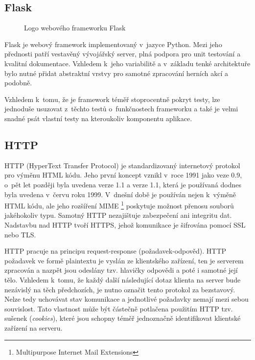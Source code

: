 \subsection{Flask}
\label{subsec:flask}
\begin{wrapfigure}[16]{R}{\textwidth/3}
    \centering
    
    \caption{Logo webového frameworku Flask}
\end{wrapfigure}

Flask je webový framework implementovaný v~jazyce Python. Mezi jeho přednosti patří vestavěný vývojářský server, plná podpora pro unit testování a kvalitní dokumentace. Vzhledem k~jeho variabilitě a v~základu tenké architektuře bylo nutné přidat abstraktní vrstvy pro samotné zpracování herních akcí a podobně.

Vzhledem k~tomu, že je framework téměř stoprocentně pokryt testy, lze jednoduše usuzovat z~těchto testů o~funkčnostech frameworku a také je velmi snadné psát vlastní testy na kteroukoliv komponentu aplikace.

\subsection{HTTP}
\label{subsec:http}
\begin{sloppypar}
	HTTP (HyperText Transfer Protocol) je standardizovaný internetový protokol pro výměnu HTML kódu. Jeho první koncept vznikl v~roce 1991 jako veze 0.9, o~pět let později byla uvedena verze 1.1 a verze 1.1, která je používaná dodnes byla uvedena v~červu roku 1999. V~dnešní době je používán nejen k~výměně HTML kódu, ale jeho rozšíření MIME \footnote{Multipurpose Internet Mail Extensions} poskytuje možnost přenosu souborů jakéhokoliv typu. Samotný HTTP nezajištuje zabezpečení ani integritu dat. Nadstavbu nad HTTP tvoří HTTPS, jehož komunikace je šifrována pomocí SSL nebo TLS.

	HTTP pracuje na principu request-response (požadavek-odpověd). HTTP požadavek ve formě plaintextu je vyslán ze klientského zařízení, ten je serverem zpracován a nazpět jsou odeslány tzv. hlavičky odpovědi a poté i samotné její tělo. Vzhledem k~tomu, že každý další následující dotaz klienta na server bude nezávislý na těch předchozích, je nutno označit tento protokol za bezstavový. Nelze tedy uchovávat stav komunikace a jednotlivé požadavky nemají mezi sebou souvislost. Tato vlastnost může být částečně potlačena použitím HTTP tzv. sušenek (\emph{cookies}), které jsou schopny téměř jednoznačně identifikovat klientské zařízení na serveru.
\end{sloppypar}

